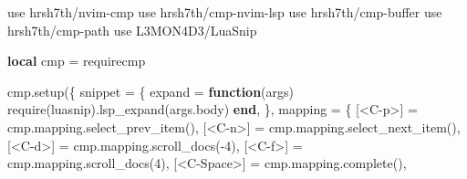 \documentclass[
  doc,
  floatsintext,
  longtable,
  a4paper,
  nolmodern,
  notxfonts,
  notimes,
  12pt,
  colorlinks=true,linkcolor=blue,citecolor=blue,urlcolor=blue]{apa7}
\newenvironment{Shaded}{\begin{snugshade}}{\end{snugshade}}
\newcommand{\DecValTok}[1]{\textcolor[rgb]{0.68,0.00,0.00}{#1}}
\newcommand{\FunctionTok}[1]{\textcolor[rgb]{0.28,0.35,0.67}{#1}}
\newcommand{\KeywordTok}[1]{\textcolor[rgb]{0.00,0.23,0.31}{\textbf{#1}}}
\newcommand{\NormalTok}[1]{\textcolor[rgb]{0.00,0.23,0.31}{#1}}
\newcommand{\OperatorTok}[1]{\textcolor[rgb]{0.37,0.37,0.37}{#1}}
\newcommand{\StringTok}[1]{\textcolor[rgb]{0.13,0.47,0.30}{#1}}
\newcommand{\VariableTok}[1]{\textcolor[rgb]{0.07,0.07,0.07}{#1}}
\begin{document}
\begin{Shaded}
\begin{Highlighting}[]
\NormalTok{use }\StringTok{\textquotesingle{}hrsh7th/nvim{-}cmp\textquotesingle{}}
\NormalTok{use }\StringTok{\textquotesingle{}hrsh7th/cmp{-}nvim{-}lsp\textquotesingle{}}
\NormalTok{use }\StringTok{\textquotesingle{}hrsh7th/cmp{-}buffer\textquotesingle{}}
\NormalTok{use }\StringTok{\textquotesingle{}hrsh7th/cmp{-}path\textquotesingle{}}
\NormalTok{use }\StringTok{\textquotesingle{}L3MON4D3/LuaSnip\textquotesingle{}}

\KeywordTok{local} \VariableTok{cmp} \OperatorTok{=} \FunctionTok{require}\StringTok{\textquotesingle{}cmp\textquotesingle{}}

\VariableTok{cmp}\OperatorTok{.}\NormalTok{setup}\OperatorTok{(\{}
    \VariableTok{snippet} \OperatorTok{=} \OperatorTok{\{}
        \VariableTok{expand} \OperatorTok{=} \KeywordTok{function}\OperatorTok{(}\VariableTok{args}\OperatorTok{)}
            \FunctionTok{require}\OperatorTok{(}\StringTok{\textquotesingle{}luasnip\textquotesingle{}}\OperatorTok{).}\NormalTok{lsp\_expand}\OperatorTok{(}\VariableTok{args}\OperatorTok{.}\VariableTok{body}\OperatorTok{)}
        \KeywordTok{end}\OperatorTok{,}
    \OperatorTok{\},}
    \VariableTok{mapping} \OperatorTok{=} \OperatorTok{\{}
        \OperatorTok{[}\StringTok{\textquotesingle{}\textless{}C{-}p\textgreater{}\textquotesingle{}}\OperatorTok{]} \OperatorTok{=} \VariableTok{cmp}\OperatorTok{.}\VariableTok{mapping}\OperatorTok{.}\NormalTok{select\_prev\_item}\OperatorTok{(),}
        \OperatorTok{[}\StringTok{\textquotesingle{}\textless{}C{-}n\textgreater{}\textquotesingle{}}\OperatorTok{]} \OperatorTok{=} \VariableTok{cmp}\OperatorTok{.}\VariableTok{mapping}\OperatorTok{.}\NormalTok{select\_next\_item}\OperatorTok{(),}
        \OperatorTok{[}\StringTok{\textquotesingle{}\textless{}C{-}d\textgreater{}\textquotesingle{}}\OperatorTok{]} \OperatorTok{=} \VariableTok{cmp}\OperatorTok{.}\VariableTok{mapping}\OperatorTok{.}\NormalTok{scroll\_docs}\OperatorTok{({-}}\DecValTok{4}\OperatorTok{),}
        \OperatorTok{[}\StringTok{\textquotesingle{}\textless{}C{-}f\textgreater{}\textquotesingle{}}\OperatorTok{]} \OperatorTok{=} \VariableTok{cmp}\OperatorTok{.}\VariableTok{mapping}\OperatorTok{.}\NormalTok{scroll\_docs}\OperatorTok{(}\DecValTok{4}\OperatorTok{),}
        \OperatorTok{[}\StringTok{\textquotesingle{}\textless{}C{-}Space\textgreater{}\textquotesingle{}}\OperatorTok{]} \OperatorTok{=} \VariableTok{cmp}\OperatorTok{.}\VariableTok{mapping}\OperatorTok{.}\NormalTok{complete}\OperatorTok{(),}

\end{Highlighting}
\end{Shaded}
\end{document}
